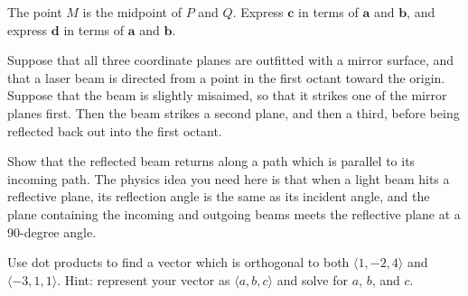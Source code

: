 \documentclass{watsonbook}
\begin{document}
\begin{aexercise}
  \begin{minipage}[t]{0.58\textwidth}
    The point $M$ is the midpoint of $P$ and $Q$. Express $\mathbf{c}$
    in terms of $\mathbf{a}$ and $\mathbf{b}$, and express $\mathbf{d}$
    in terms of $\mathbf{a}$ and $\mathbf{b}$.
  \end{minipage} \hspace{6mm}
  \begin{minipage}[t]{0.4\textwidth}
  \end{minipage}
\end{aexercise}

\begin{aexercise}
  Suppose that all three coordinate planes are outfitted with a mirror
  surface, and that a laser beam is directed from a point in the first
  octant toward the origin. Suppose that the beam is slightly
  misaimed, so that it strikes one of the mirror planes first. Then
  the beam strikes a second plane, and then a third, before being
  reflected back out into the first octant.

  Show that the reflected beam returns along a  path which is parallel
  to its incoming path. The physics idea you need here is that when  a
  light beam hits a reflective plane, its reflection angle is the same
  as its incident angle, and the plane containing the incoming and
  outgoing beams meets the reflective plane at a 90-degree angle. 
\end{aexercise}


\begin{aexercise}
  Use dot products to find a vector which is orthogonal to both
  $\langle 1, -2, 4 \rangle$ and $\langle -3, 1, 1 \rangle$. Hint:
  represent your vector as $\langle a, b, c \rangle$ and solve for
  $a$, $b$, and $c$. 
\end{aexercise}
\end{document}
